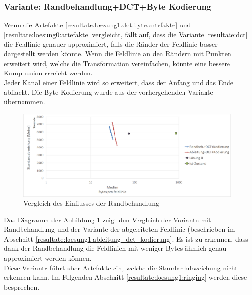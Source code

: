 \subsubsection{Variante: Randbehandlung+DCT+Byte Kodierung} \label{resultate:loesung1:dct:randbeh+byte}
Wenn  die Artefakte \ref{resultate:loesung1:dct:byte:artefakte} und \ref{resultate:loesung0:artefakte} vergleicht, fällt auf, dass die Variante \ref{resultate:dct} die Feldlinie genauer approximiert, falls die Ränder der Feldlinie besser dargestellt werden könnte. Wenn die Feldlinie an den Rändern mit Punkten erweitert wird, welche die Transformation vereinfachen, könnte eine bessere Kompression erreicht werden.\\
Jeder Kanal einer Feldlinie wird so erweitert, dass der Anfang und das Ende abflacht. Die Byte-Kodierung wurde aus der vorhergehenden Variante übernommen.
\begin{figure}[!htbp]
	\center	\includegraphics[width=1\textwidth,keepaspectratio]{./pictures/resultate/loesung1/loesung1-7/loesung1_7.png}
	\caption{Vergleich des Einflusses der Randbehandlung}
	\label{resultate:loesung1:dct:randbehandlung}
\end{figure}
Das Diagramm der Abbildung \ref{resultate:loesung1:dct:randbehandlung} zeigt den Vergleich der Variante mit Randbehandlung und der Variante der abgeleiteten Feldlinie (beschrieben im Abschnitt \ref{resultate:loesung1:ableitung_dct_kodierung}. Es ist zu erkennen, dass dank der Randbehandlung die Feldlinien mit weniger Bytes ähnlich genau approximiert werden können.\\
Diese Variante führt aber Artefakte ein, welche die Standardabweichung nicht erkennen kann. Im Folgenden Abschnitt \ref{resultate:loesung1:ringing} werden diese besprochen.

